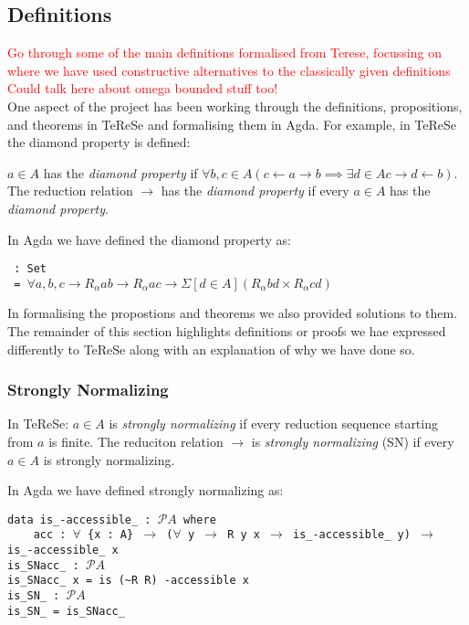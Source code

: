 \documentclass{scrartcl}
\begin{document}
\subsection{Definitions}
\textcolor{red}{Go through some of the main definitions formalised from Terese, focussing on where we have used constructive alternatives to the classically given definitions
Could talk here about omega bounded stuff too!}
\\
One aspect of the project has been working through the definitions, propositions, and theorems in TeReSe and formalising them in Agda.
For example, in TeReSe the diamond property is defined:
\begin{center}
    $a \in A$ has the \textit{diamond property} if $\forall b, c \in A (c \leftarrow a \rightarrow b \implies \exists d \in A c \rightarrow d \leftarrow b)$. The reduction relation $\rightarrow$ has the \textit{diamond property} if every $a \in A$ has the \textit{diamond property}.
\end{center}
In Agda we have defined the diamond property as:
\begin{flushleft}
    \texttt{ : Set}\\
    \texttt{ = $\forall a, b, c \rightarrow R_{\alpha} a b \rightarrow R_{\alpha} a c \rightarrow \Sigma[ d \in A ] (R_{\alpha} b d \times R_{\alpha} c d)$}
\end{flushleft}
In formalising the propostions and theorems we also provided solutions to them. \\
The remainder of this section highlights definitions or proofs we hae expressed differently to TeReSe along with an explanation of why we have done so.

\subsubsection{Strongly Normalizing}
\begin{center}
    In TeReSe: $a \in A$ is \textit{strongly normalizing} if every reduction sequence starting from $a$ is finite. The reduciton relation $\rightarrow$ is \textit{strongly normalizing} (SN) if every $a \in A$ is strongly normalizing.
\end{center}
In Agda we have defined strongly normalizing as:

\begin{flushleft}
    \texttt{data is\_-accessible\_ : $\mathscr{P} A$ where}\\
    \texttt{\ \ \ \ acc : $\forall$ \{x : A\} $\rightarrow$ ($\forall$ y $\rightarrow$ R y x $\rightarrow$ is\_-accessible\_ y) $\rightarrow$ \quad is\_-accessible\_ x}\\
    \texttt{is\_SNacc\_ : $\mathscr{P} A$}\\
    \texttt{is\_SNacc\_ x = is (\textasciitilde R R) -accessible x}\\
    \texttt{is\_SN\_ : $\mathscr{P} A$}\\
    \texttt{is\_SN\_ = is\_SNacc\_}
\end{flushleft}
\end{document}
